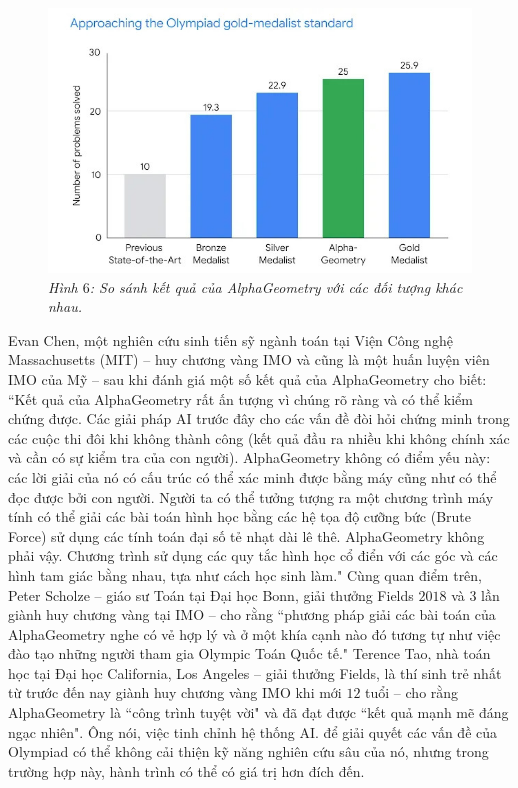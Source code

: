 \begin{multicols}{2}
	\begin{figure}[H]
		\vspace*{-5pt}
		\centering
		\captionsetup{labelformat= empty, justification=centering}
		\includegraphics[width= 1\linewidth]{Results.jpg}
		\caption{\small\textit{\color{timhieukhoahoc}Hình $6$: So sánh kết quả của AlphaGeometry với các đối tượng khác nhau.}}
		\vspace*{-5pt}
	\end{figure}
	Evan Chen, một nghiên cứu sinh tiến sỹ ngành toán tại Viện Công nghệ Massachusetts (MIT) -- huy chương vàng IMO và cũng là một huấn luyện viên IMO của Mỹ -- sau khi đánh giá một số kết quả của AlphaGeometry cho biết: ``Kết quả của AlphaGeometry rất ấn tượng vì chúng rõ ràng và có thể kiểm chứng được. Các giải pháp AI trước đây cho các vấn đề đòi hỏi chứng minh trong các cuộc thi đôi khi không thành công (kết quả đầu ra nhiều khi không chính xác và cần có sự kiểm tra của con người). AlphaGeometry không có điểm yếu này: các lời giải của nó có cấu trúc có thể xác minh được bằng máy cũng như có thể đọc được bởi con người. Người ta có thể tưởng tượng ra một chương trình máy tính có thể giải các bài toán hình học bằng các hệ tọa độ cưỡng bức (Brute Force) sử dụng các tính toán đại số tẻ nhạt dài lê thê. AlphaGeometry không phải vậy. Chương trình sử dụng các quy tắc hình học cổ điển với các góc và các hình tam giác bằng nhau, tựa như cách học sinh làm."
	\vskip 0.1cm
	Cùng quan điểm trên, Peter Scholze -- giáo sư Toán tại Đại học Bonn, giải thưởng Fields $2018$ và $3$ lần giành huy chương vàng tại IMO -- cho rằng ``phương pháp giải các bài toán của AlphaGeometry nghe có vẻ hợp lý và ở một khía cạnh nào đó tương tự như việc đào tạo những người tham gia Olympic Toán Quốc tế."
	\vskip 0.1cm
	Terence Tao, nhà toán học tại Đại học California, Los Angeles -- giải thưởng Fields, là thí sinh trẻ nhất từ trước đến nay giành huy chương vàng IMO khi mới $12$ tuổi -- cho rằng AlphaGeometry là ``công trình tuyệt vời" và đã đạt được ``kết quả mạnh mẽ đáng ngạc nhiên". Ông nói, việc tinh chỉnh hệ thống AI. để giải quyết các vấn đề của Olympiad có thể không cải thiện kỹ năng nghiên cứu sâu của nó, nhưng trong trường hợp này, hành trình có thể có giá trị hơn đích đến.

\end{multicols}
